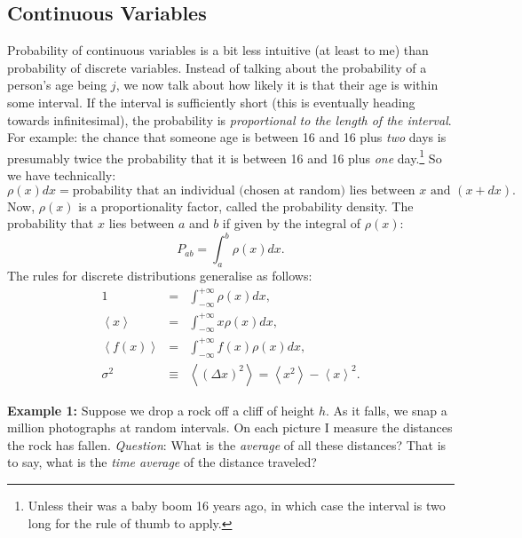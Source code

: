 \documentclass{article}
\begin{document}
\subsection{Continuous Variables}
Probability of continuous variables is a bit less intuitive (at least to me) than probability of discrete variables. Instead of talking about the probability of a person's age being $j$, we now talk about how likely it is that their age is within some interval. If the interval is sufficiently short (this is eventually heading towards infinitesimal), the probability is \emph{proportional to the length of the interval}. For example: the chance that someone age is between 16 and 16 plus \emph{two} days is presumably twice the probability that it is between 16 and 16 plus \emph{one} day.\footnote{Unless their was a baby boom 16 years ago, in which case the interval is two long for the rule of thumb to apply.} So we have technically:
\begin{equation}
\rho (x) dx = \text{probability that an individual (chosen at random) lies between $x$ and $(x+dx)$}.
\label{probability_density_equation}
\end{equation}
Now, $\rho (x)$ is a proportionality factor, called the probability density. The probability that $x$ lies between $a$ and $b$ if given by the integral of $\rho (x)$:
\begin{equation}
P_{ab} = \int_{a}^{b} \rho (x) dx.
\end{equation}
The rules for discrete distributions generalise as follows:
\begin{eqnarray}
\label{unity}
1 &=& \int_{-\infty}^{+\infty}\rho (x) dx, \\
\label{expectation_value}
\left< x \right> &=& \int_{-\infty}^{+\infty} x \rho (x) dx, \\
\left< f(x) \right> &=& \int_{-\infty}^{+\infty} f(x)\rho (x) dx, \\
\sigma^{2} & \equiv & \left< \left( \Delta x\right)^{2}\right> = \left< x^{2} \right> - \left< x \right>^{2}.
\end{eqnarray}

\noindent\makebox[\linewidth]{\rule{\textwidth}{0.4pt}}
\textbf{Example 1:} Suppose we drop a rock off a cliff of height $h$. As it falls, we snap a million photographs at random intervals. On each picture I measure the distances the rock has fallen. \emph{Question}: What is the \emph{average} of all these distances? That is to say, what is the \emph{time average} of the distance traveled?
\end{document}
